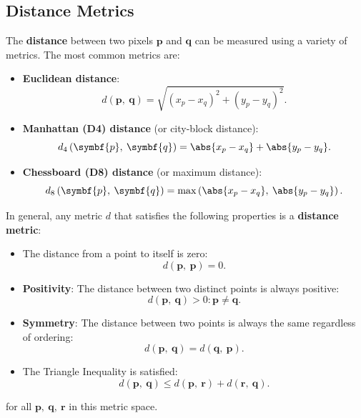 \documentclass{article}
\begin{document}
\subsection{Distance Metrics}
The \textbf{distance} between two pixels \(\symbf{p}\) and
\(\symbf{q}\) can be measured using a variety of metrics. The most
common metrics are:
\begin{itemize}
    \item \textbf{Euclidean distance}:
          \begin{equation*}
              d\left( \symbf{p},\: \symbf{q} \right) = \sqrt{\left( x_p - x_q \right)^2 + \left( y_p - y_q \right)^2}.
          \end{equation*}
    \item \textbf{Manhattan (D4) distance} (or city-block distance):
          \begin{equation*}
              d_4\left( \symbf{p},\: \symbf{q} \right) = \abs{x_p - x_q} + \abs{y_p - y_q}.
          \end{equation*}
    \item \textbf{Chessboard (D8) distance} (or maximum distance):
          \begin{equation*}
              d_8\left( \symbf{p},\: \symbf{q} \right) = \max\left( \abs{x_p - x_q},\: \abs{y_p - y_q} \right).
          \end{equation*}
\end{itemize}
In general, any metric \(d\) that satisfies the following properties is a
\textbf{distance metric}:
\begin{itemize}
    \item The distance from a point to itself is zero:
          \begin{equation*}
              d\left( \symbf{p},\: \symbf{p} \right) = 0.
          \end{equation*}
    \item \textbf{Positivity}: The distance between two distinct points is always positive:
          \begin{equation*}
              d\left( \symbf{p},\: \symbf{q} \right) > 0 : \symbf{p} \neq \symbf{q}.
          \end{equation*}
    \item \textbf{Symmetry}: The distance between two points is always the same regardless of ordering:
          \begin{equation*}
              d\left( \symbf{p},\: \symbf{q} \right) = d\left( \symbf{q},\: \symbf{p} \right).
          \end{equation*}
    \item The Triangle Inequality is satisfied:
          \begin{equation*}
              d\left( \symbf{p},\: \symbf{q} \right) \leq d\left( \symbf{p},\: \symbf{r} \right) + d\left( \symbf{r},\: \symbf{q} \right).
          \end{equation*}
\end{itemize}
for all \(\symbf{p},\: \symbf{q},\: \symbf{r}\) in this metric space.
\end{document}
